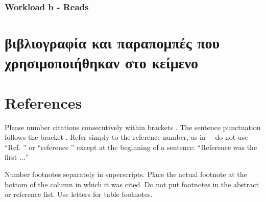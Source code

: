\documentclass[conference]{IEEEtran}
\begin{document}
\subsubsection{Workload b - Reads}


\section{βιβλιογραφία και παραπομπές που χρησιμοποιήθηκαν στο κείμενο}

\section*{References}

Please number citations consecutively within brackets \cite{b1}. The 
sentence punctuation follows the bracket \cite{b2}. Refer simply to the reference 
number, as in \cite{b3}---do not use ``Ref. \cite{b3}'' or ``reference \cite{b3}'' except at 
the beginning of a sentence: ``Reference \cite{b3} was the first $\ldots$''

Number footnotes separately in superscripts. Place the actual footnote at 
the bottom of the column in which it was cited. Do not put footnotes in the 
abstract or reference list. Use letters for table footnotes.
\end{document}

